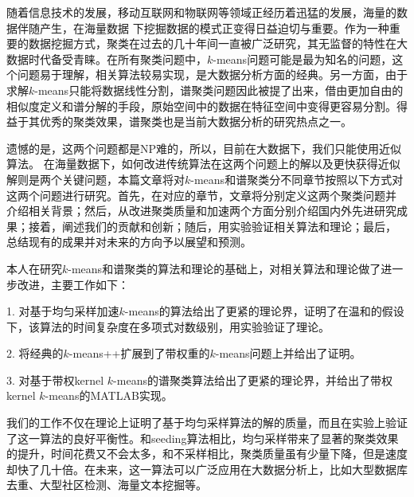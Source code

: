 	
\begin{chineseabstract}
随着信息技术的发展，移动互联网和物联网等领域正经历着迅猛的发展，海量的数据伴随产生，在海量数据
下挖掘数据的模式正变得日益迫切与重要。作为一种重要的数据挖掘方式，聚类在过去的几十年间一直被广泛研究，其无监督的特性在大数据时代备受青睐。在所有聚类问题中，$k$-means问题可能是最为知名的问题，这个问题易于理解，相关算法较易实现，是大数据分析方面的经典。另一方面，由于求解$k$-means只能将数据线性分割，谱聚类问题因此被提了出来，借由更加自由的相似度定义和谱分解的手段，原始空间中的数据在特征空间中变得更容易分割。得益于其优秀的聚类效果，谱聚类也是当前大数据分析的研究热点之一。

遗憾的是，这两个问题都是NP难的，所以，目前在大数据下，我们只能使用近似算法。
在海量数据下，如何改进传统算法在这两个问题上的解以及更快获得近似解则是两个关键问题，本篇文章将对$k$-means和谱聚类分不同章节按照以下方式对这两个问题进行研究。首先，在对应的章节，文章将分别定义这两个聚类问题并
介绍相关背景；然后，从改进聚类质量和加速两个方面分别介绍国内外先进研究成果；接着，阐述我们的贡献和创新；随后，用实验验证相关算法和理论；最后， 总结现有的成果并对未来的方向予以展望和预测。

本人在研究$k$-means和谱聚类的算法和理论的基础上，对相关算法和理论做了进一步改进，主要工作如下：

1. 对基于均匀采样加速$k$-means的算法给出了更紧的理论界，证明了在温和的假设下，该算法的时间复杂度在多项式对数级别，用实验验证了理论。

2. 将经典的$k$-means++扩展到了带权重的$k$-means问题上并给出了证明。

3. 对基于带权kernel $k$-means的谱聚类算法给出了更紧的理论界，并给出了带权kernel $k$-means的MATLAB实现。

我们的工作不仅在理论上证明了基于均匀采样算法的解的质量，而且在实验上验证了这一算法的良好平衡性。和seeding算法相比，均匀采样带来了显著的聚类效果的提升，时间花费又不会太多，和不采样相比，聚类质量虽有少量下降，但是速度却快了几十倍。在未来，这一算法可以广泛应用在大数据分析上，比如大型数据库去重、大型社区检测、海量文本挖掘等。

\end{chineseabstract}

